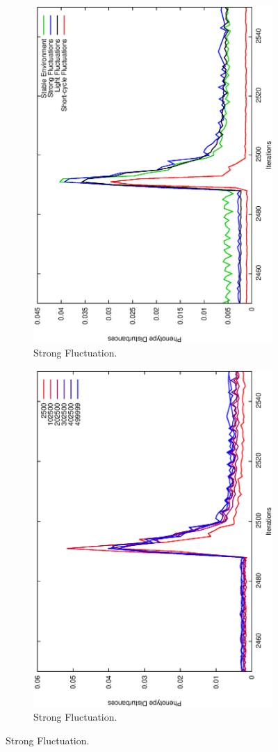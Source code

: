\begin{figure}[H]
\begin{subfigure}{.25\textwidth}
  \centering
  \includegraphics[width=.7\linewidth, angle =-90]{img/Sucavg499999variationb.eps}
  \caption{Strong Fluctuation.}
  \label{fig:transst}
\end{subfigure}%
\begin{subfigure}{.25\textwidth}
  \centering
  \includegraphics[width=.7\linewidth, angle =-90]{img/SucavgvarValidvariationb.eps}
  \caption{Strong Fluctuation.}
  \label{fig:transli}
\end{subfigure}


\end{figure}
